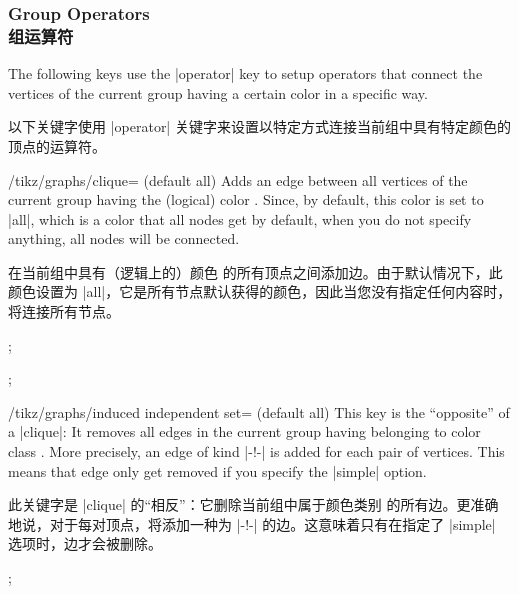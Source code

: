 \subsubsection{Group Operators\\组运算符}

The following keys use the |operator| key to setup operators that connect the
vertices of the current group having a certain color in a specific way.

以下关键字使用 |operator| 关键字来设置以特定方式连接当前组中具有特定颜色的顶点的运算符。

\begin{key}{/tikz/graphs/clique= (default all)}
    Adds an edge between all vertices of the current group having the (logical)
    color . Since, by default, this color is set to |all|, which is
    a color that all nodes get by default, when you do not specify anything,
    all nodes will be connected.
    
    在当前组中具有（逻辑上的）颜色  的所有顶点之间添加边。由于默认情况下，此颜色设置为 |all|，它是所有节点默认获得的颜色，因此当您没有指定任何内容时，将连接所有节点。
\begin{codeexample}[preamble={\usetikzlibrary{graphs}}]
\tikz {};
\end{codeexample}
\begin{codeexample}[preamble={\usetikzlibrary{graphs}}]
\tikz {};
\end{codeexample}
\end{key}

\begin{key}{/tikz/graphs/induced independent set= (default all)}
    This key is the ``opposite'' of a |clique|: It removes all edges in the
    current group having belonging to color class . More precisely,
    an edge of kind |-!-| is added for each pair of vertices. This means that
    edge only get removed if you specify the |simple| option.
    
    此关键字是 |clique| 的“相反”：它删除当前组中属于颜色类别  的所有边。更准确地说，对于每对顶点，将添加一种为 |-!-| 的边。这意味着只有在指定了 |simple| 选项时，边才会被删除。
\begin{codeexample}[preamble={\usetikzlibrary{graphs.standard}}]
\tikz {};
\end{codeexample}
\end{key}

